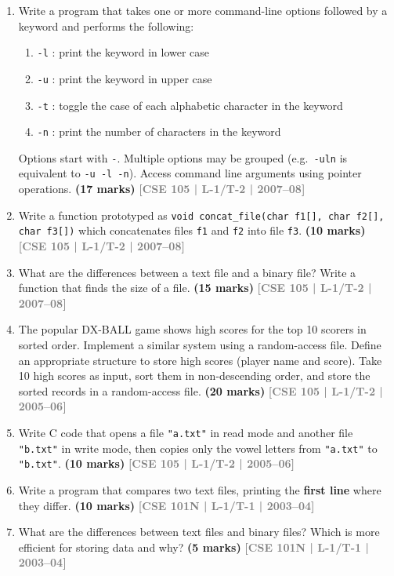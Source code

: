 \documentclass[12pt,a3paper]{article}
\newcommand{\yr}[1]{\hfill\textcolor{gray}{\small\textbf{[#1]}}}
\newcommand{\mk}[1]{\textcolor{orange!70!black}{\small\textbf{(#1 marks)}}}
\begin{document}
\begin{enumerate}
\item Write a program that takes one or more command-line options followed by a keyword and performs the following:
\begin{enumerate}
  \item \texttt{-l} : print the keyword in lower case
  \item \texttt{-u} : print the keyword in upper case
  \item \texttt{-t} : toggle the case of each alphabetic character in the keyword
  \item \texttt{-n} : print the number of characters in the keyword
\end{enumerate}
Options start with \texttt{-}. Multiple options may be grouped (e.g.\ \texttt{-uln} is equivalent to \texttt{-u -l -n}). Access command line arguments using pointer operations.
\mk{17} \yr{CSE 105 | L-1/T-2 | 2007--08}

\item Write a function prototyped as \texttt{void concat\_file(char f1[], char f2[], char f3[])} which concatenates files \texttt{f1} and \texttt{f2} into file \texttt{f3}.
\mk{10} \yr{CSE 105 | L-1/T-2 | 2007--08}

\item What are the differences between a text file and a binary file? Write a function that finds the size of a file.
\mk{15} \yr{CSE 105 | L-1/T-2 | 2007--08}

\item The popular DX-BALL game shows high scores for the top 10 scorers in sorted order. Implement a similar system using a random-access file. Define an appropriate structure to store high scores (player name and score). Take 10 high scores as input, sort them in non-descending order, and store the sorted records in a random-access file.
\mk{20} \yr{CSE 105 | L-1/T-2 | 2005--06}

\item Write C code that opens a file \texttt{"a.txt"} in read mode and another file \texttt{"b.txt"} in write mode, then copies only the vowel letters from \texttt{"a.txt"} to \texttt{"b.txt"}.
\mk{10} \yr{CSE 105 | L-1/T-2 | 2005--06}

\item Write a program that compares two text files, printing the \textbf{first line} where they differ.
\mk{10} \yr{CSE 101N | L-1/T-1 | 2003--04}

\item What are the differences between text files and binary files? Which is more efficient for storing data and why?
\mk{5} \yr{CSE 101N | L-1/T-1 | 2003--04}


\end{enumerate}
\end{document}
